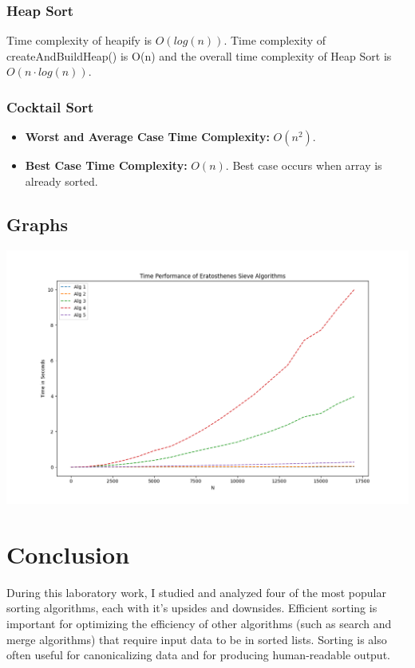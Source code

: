 \documentclass[a4paper, 12pt]{article}
\begin{document}
\subsubsection*{Heap Sort}

Time complexity of heapify is $O(log(n))$. Time complexity of createAndBuildHeap() is O(n) and the overall time complexity of Heap Sort is $O(n\cdot log(n))$.

\subsubsection*{Cocktail Sort}

\begin{itemize}
  \item \textbf{Worst and Average Case Time Complexity:} $O(n^2)$. 
  \item \textbf{Best Case Time Complexity:} $O(n)$. Best case occurs when array is already sorted.
\end{itemize}

\newpage

\subsection{Graphs}

\begin{center}
  \includegraphics[width=15cm]{graph.png}
\end{center}

\section{Conclusion}

During this laboratory work, I studied and analyzed four 
of the most popular sorting algorithms, each with it's upsides and downsides. 
Efficient sorting is important for optimizing the efficiency of other 
algorithms (such as search and merge algorithms) 
that require input data to be in sorted lists. Sorting is also often 
useful for canonicalizing data and for producing human-readable output.
\end{document}
